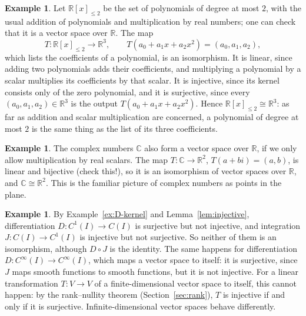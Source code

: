 \documentclass[11pt]{article}
\theoremstyle{definition}
\newtheorem{example}[definition]{Example}
\theoremstyle{plain}
\theoremstyle{remark}
\begin{document}
\begin{example}\label{ex:iso-poly}
    Let $\mathbb{R}[x]_{\leq 2}$ be the set of polynomials of degree at most $2$, with the usual addition of polynomials and multiplication by real numbers; one can check that it is a vector space over $\mathbb{R}$. The map
    \[T: \mathbb{R}[x]_{\leq 2} \to \mathbb{R}^3, \qquad T(a_0 + a_1 x + a_2 x^2) = (a_0, a_1, a_2),\]
    which lists the coefficients of a polynomial, is an isomorphism. It is linear, since adding two polynomials adds their coefficients, and multiplying a polynomial by a scalar multiplies its coefficients by that scalar. It is injective, since its kernel consists only of the zero polynomial, and it is surjective, since every $(a_0, a_1, a_2) \in \mathbb{R}^3$ is the output $T(a_0 + a_1 x + a_2 x^2)$. Hence $\mathbb{R}[x]_{\leq 2} \cong \mathbb{R}^3$: as far as addition and scalar multiplication are concerned, a polynomial of degree at most $2$ is the same thing as the list of its three coefficients.
\end{example}

\begin{example}
    The complex numbers $\mathbb{C}$ also form a vector space over $\mathbb{R}$, if we only allow multiplication by real scalars. The map $T: \mathbb{C} \to \mathbb{R}^2$, $T(a + bi) = (a, b)$, is linear and bijective (check this!), so it is an isomorphism of vector spaces over $\mathbb{R}$, and $\mathbb{C} \cong \mathbb{R}^2$. This is the familiar picture of complex numbers as points in the plane.
\end{example}

\begin{example}\label{ex:D-not-iso}
    By Example~\ref{ex:D-kernel} and Lemma~\ref{lem:injective}, differentiation $D: C^1(I) \to C(I)$ is surjective but not injective, and integration $J: C(I) \to C^1(I)$ is injective but not surjective. So neither of them is an isomorphism, although $D \circ J$ is the identity. The same happens for differentiation $D: C^\infty(I) \to C^\infty(I)$, which maps a vector space to itself: it is surjective, since $J$ maps smooth functions to smooth functions, but it is not injective. For a linear transformation $T: V \to V$ of a finite-dimensional vector space to itself, this cannot happen: by the rank--nullity theorem (Section~\ref{sec:rank}), $T$ is injective if and only if it is surjective. Infinite-dimensional vector spaces behave differently.
\end{example}
\end{document}
